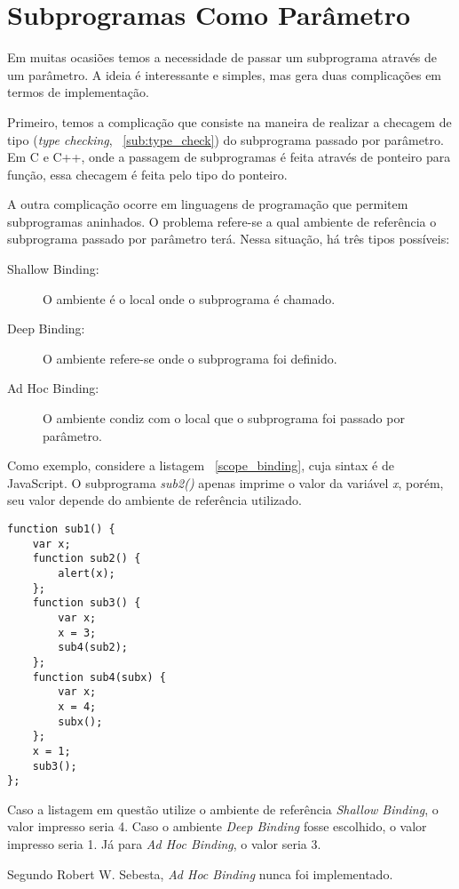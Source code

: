 
\section{Subprogramas Como Parâmetro} %
\label{sec:subprogramas_como_parametro}
Em muitas ocasiões temos a necessidade de passar um subprograma através de um parâmetro. A ideia é interessante e simples, mas gera duas complicações em termos de implementação.

Primeiro, temos a complicação que consiste na maneira de realizar a checagem de tipo (\textit{type checking}, ~\ref{sub:type_check}) do subprograma passado por parâmetro. Em C e C++, onde a passagem de subprogramas é feita através de ponteiro para função, essa checagem é feita pelo tipo do ponteiro.

A outra complicação ocorre em linguagens de programação que permitem subprogramas aninhados. O problema refere-se a qual ambiente de referência o subprograma passado por parâmetro terá. Nessa situação, há três tipos possíveis:
\begin{description}
	\item[Shallow Binding:] O ambiente é o local onde o subprograma é chamado.
	\item[Deep Binding:] O ambiente refere-se onde o subprograma foi definido.
	\item[Ad Hoc Binding:] O ambiente condiz com o local que o subprograma foi passado por parâmetro.
\end{description}

Como exemplo, considere a listagem ~\ref{scope_binding}, cuja sintax é de JavaScript. O subprograma \textit{sub2()} apenas imprime o valor da variável \textit{x}, porém, seu valor depende do ambiente de referência utilizado. 

\begin{lstlisting}[caption=Código retirado de \cite{sebesta}]
function sub1() {
	var x;
	function sub2() {
		alert(x);
	};
	function sub3() {
		var x;
		x = 3;
		sub4(sub2);
	};
	function sub4(subx) {
		var x;
		x = 4;
		subx();
	};
	x = 1;
	sub3();
};
\end{lstlisting}
\label{scope_binding}

Caso a listagem em questão utilize o ambiente de referência \textit{Shallow Binding}, o valor impresso seria 4. Caso o ambiente \textit{Deep Binding} fosse escolhido, o valor impresso seria 1. Já para \textit{Ad Hoc Binding}, o valor seria 3.

Segundo Robert W. Sebesta, \textit{Ad Hoc Binding} nunca foi implementado.

